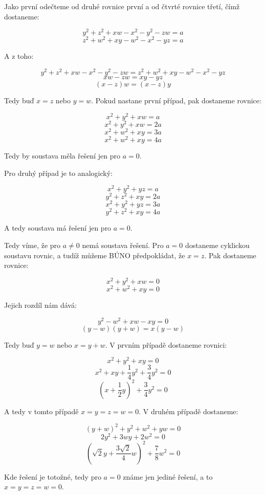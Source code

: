 \documentclass{fkssolpub}
\author{Ondřej Sedláček}
\begin{document}
Jako první odečteme od druhé rovnice první a od čtvrté rovnice třetí, čímž dostaneme:

\[
  y^2 + z^2 + xw - x^2 - y ^2 - zw = a
\]
\[
  z^2 + w^2 + xy - w^2 - x^2 - yz = a
\]

A z toho:

\[
  y^2 + z^2 + xw - x^2 - y ^2 - zw = z^2 + w^2 + xy - w^2 - x^2 - yz
\]
\[
  xw - zw = xy - yz
\]
\[
  (x - z) w = (x - z) y
\]

Tedy buď $x = z$ nebo $y = w$. Pokud nastane první případ, pak dostaneme rovnice:

\[
  x^2 + y^2 + xw = a
\]
\[
  x^2 + y^2 + xw = 2a
\]
\[
  x^2 + w^2 + xy = 3a
\]
\[
  x^2 + w^2 + xy = 4a
\]

Tedy by soustava měla řešení jen pro $a = 0$.

Pro druhý případ je to analogický:

\[
  x^2 + y^2 + yz = a
\]
\[
  y^2 + z^2 + xy = 2a
\]
\[
  x^2 + y^2 + yz = 3a
\]
\[
  y^2 + z^2 + xy = 4a
\]

A tedy soustava má řešení jen pro $a = 0$.

Tedy víme, že pro $a \neq 0$ nemá soustava řešení. Pro $a = 0$ dostaneme cyklickou soustavu rovnic, a tudíž můžeme BÚNO předpokládat, že $x = z$. Pak dostaneme rovnice:

\[
  x^2 + y^2 + xw = 0
\]
\[
  x^2 + w^2 + xy = 0
\]

Jejich rozdíl nám dává:

\[
  y^2 - w^2 + xw - xy = 0
\]
\[
  (y - w)(y + w) = x(y - w)
\]

Tedy buď $y = w$ nebo $x = y + w$. V prvním případě dostaneme rovnici:

\[
  x^2 + y^2 + xy = 0
\]
\[
  x^2 + xy + \frac{1}{4} y^2 + \frac{3}{4} y^2 = 0
\]
\[
  \left(x + \frac{1}{2} y\right)^2 + \frac{3}{4} y^2 = 0
\]

A tedy v tomto případě $x = y = z = w = 0$. V druhém případě dostaneme:

\[
  (y + w)^2 + y^2 + w^2 + yw = 0
\]
\[
  2y^2 + 3wy + 2w^2 = 0
\]
\[
  \left(\sqrt{2} y + \frac{3 \sqrt{2}}{4} w\right)^2 + \frac{7}{8} w^2 = 0
\]

  Kde řešení je totožné, tedy pro $a = 0$ známe jen jediné řešení, a to $x = y = z = w= 0$.
\end{document}
